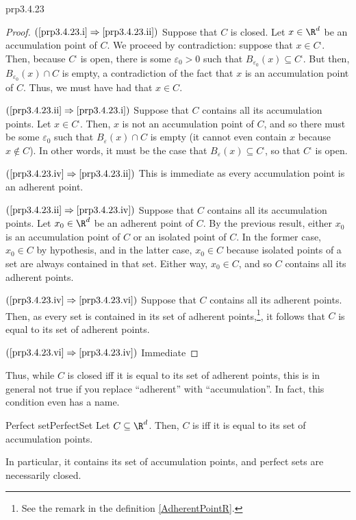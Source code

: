 \begin{thm}{}{prp3.4.23}
\begin{proof}
\blankline
\noindent
$(\cref{prp3.4.23.i}\Rightarrow \cref{prp3.4.23.ii})$ Suppose that $C$ is closed.  Let $x\in \R ^d$ be an accumulation point of $C$.  We proceed by contradiction:  suppose that $x\in C^{\comp}$.  Then, because $C^{\comp}$ is open, there is some $\varepsilon _0>0$ such that $B_{\varepsilon _0}(x)\subseteq C^{\comp}$.  But then, $B_{\varepsilon _0}(x)\cap C$ is empty, a contradiction of the fact that $x$ is an accumulation point of $C$.  Thus, we must have had that $x\in C$.

\blankline
\noindent
$(\cref{prp3.4.23.ii}\Rightarrow \cref{prp3.4.23.i})$ Suppose that $C$ contains all its accumulation points.  Let $x\in C^{\comp}$.  Then, $x$ is not an accumulation point of $C$, and so there must be some $\varepsilon _0$ such that $B_{\varepsilon}(x)\cap C$ is empty (it cannot even contain $x$ because $x\notin C$).  In other words, it must be the case that $B_{\varepsilon}(x)\subseteq C^{\comp}$, so that $C^{\comp}$ is open.

\blankline
\noindent
$(\cref{prp3.4.23.iv}\Rightarrow \cref{prp3.4.23.ii})$ This is immediate as every accumulation point is an adherent point.

\blankline
\noindent
$(\cref{prp3.4.23.ii}\Rightarrow \cref{prp3.4.23.iv})$ Suppose that $C$ contains all its accumulation points.  Let $x_0\in \R ^d$ be an adherent point of $C$.  By the previous result, either $x_0$ is an accumulation point of $C$ or an isolated point of $C$.  In the former case, $x_0\in C$ by hypothesis, and in the latter case, $x_0\in C$ because isolated points of a set are always contained in that set.  Either way, $x_0\in C$, and so $C$ contains all its adherent points.

\blankline
\noindent
$(\cref{prp3.4.23.iv}\Rightarrow \cref{prp3.4.23.vi})$ Suppose that $C$ contains all its adherent points.  Then, as every set is contained in its set of adherent points,\footnote{See the remark in the definition \cref{AdherentPointR}.}, it follows that $C$ is equal to its set of adherent points.

\blankline
\noindent
$(\cref{prp3.4.23.vi}\Rightarrow \cref{prp3.4.23.iv})$ Immediate
\end{proof}
\end{thm}
Thus, while $C$ is closed iff it is equal to its set of adherent points, this is in general not true if you replace ``adherent'' with ``accumulation''.  In fact, this condition even has a name.
\begin{dfn}{Perfect set}{PerfectSet}
Let $C\subseteq \R ^d$.  Then, $C$ is  iff it is equal to its set of accumulation points.
\begin{rmk}
In particular, it contains its set of accumulation points, and perfect sets are necessarily closed.
\end{rmk}
\end{dfn}
